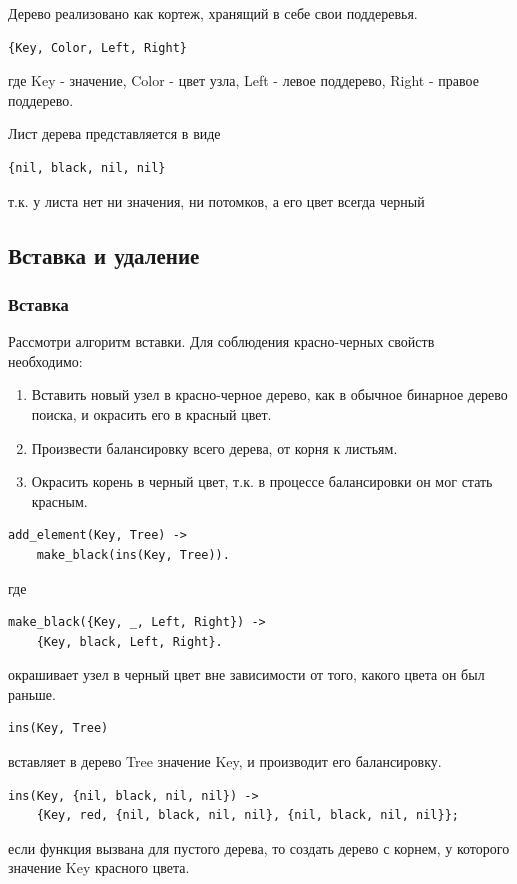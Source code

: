 		Дерево реализовано как кортеж, хранящий в себе свои поддеревья.
		\begin{lstlisting}
{Key, Color, Left, Right}
		\end{lstlisting}
		где Key - значение, Color - цвет узла, Left - левое поддерево,
		Right - правое поддерево.

		Лист дерева представляется в виде 
		\begin{lstlisting}
{nil, black, nil, nil}
		\end{lstlisting}
		т.к. у листа нет ни значения, ни потомков, а его цвет всегда черный


	\subsection{Вставка и удаление}
		\subsubsection{Вставка}
			Рассмотри алгоритм вставки. Для соблюдения красно-черных свойств необходимо:
			\begin{enumerate}
				\item Вставить новый узел в красно-черное дерево, как в обычное бинарное 
					  дерево поиска, и окрасить его в красный цвет.
				\item Произвести балансировку всего дерева, от корня к листьям.
				\item Окрасить корень в черный цвет, т.к. в процессе балансировки он мог 
				      стать красным.
			\end{enumerate}

			\begin{lstlisting}
add_element(Key, Tree) ->
    make_black(ins(Key, Tree)).
			\end{lstlisting}
			где
			\begin{lstlisting}
make_black({Key, _, Left, Right}) ->
    {Key, black, Left, Right}.
			\end{lstlisting}
			окрашивает узел в черный цвет вне зависимости от того, какого цвета он был раньше.
	
			\begin{lstlisting}
ins(Key, Tree)
			\end{lstlisting}
			вставляет в дерево Tree значение Key, и производит его балансировку.
		
			\begin{lstlisting}
ins(Key, {nil, black, nil, nil}) ->
    {Key, red, {nil, black, nil, nil}, {nil, black, nil, nil}};
			\end{lstlisting} 
			если функция вызвана для пустого дерева, то создать дерево с корнем, у которого 
			значение Key красного цвета.
		
